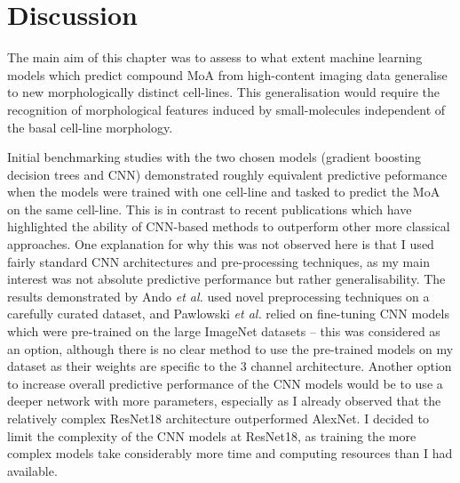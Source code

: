 \documentclass[a4paper,11pt,twoside,openright]{scrbook}
\begin{document}

\section{Discussion}

The main aim of this chapter was to assess to what extent machine learning models which predict compound MoA from high-content imaging data generalise to new morphologically distinct cell-lines.
This generalisation would require the recognition of morphological features induced by small-molecules independent of the basal cell-line morphology.

Initial benchmarking studies with the two chosen models (gradient boosting decision trees and CNN) demonstrated roughly equivalent predictive peformance when the models were trained with one cell-line and tasked to predict the MoA on the same cell-line.
This is in contrast to recent publications which have highlighted the ability of CNN-based methods to outperform other more classical approaches. \cite{Ando2017, Pawlowski2016}
One explanation for why this was not observed here is that I used fairly standard CNN architectures and pre-processing techniques, as my main interest was not absolute predictive performance but rather generalisability.
The results demonstrated by Ando \textit{et al.} used novel preprocessing techniques on a carefully curated dataset, and Pawlowski \textit{et al.} relied on fine-tuning CNN models which were pre-trained on the large ImageNet datasets -- this was considered as an option, although there is no clear method to use the pre-trained models on my dataset as their weights are specific to the 3 channel architecture.
Another option to increase overall predictive performance of the CNN models would be to use a deeper network with more parameters, especially as I already observed that the relatively complex ResNet18 architecture outperformed AlexNet.
I decided to limit the complexity of the CNN models at ResNet18, as training the more complex models take considerably more time and computing resources than I had available.
\end{document}
